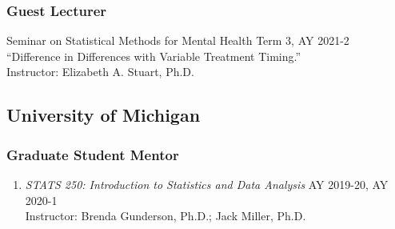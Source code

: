 \documentclass[letterpaper,11pt]{article} %
\begin{document}
		\subsubsection*{Guest Lecturer}
		\begin{etaremune}
			\item Seminar on Statistical Methods for Mental Health \hfill Term 3, AY 2021-2 \\
			``Difference in Differences with Variable Treatment Timing.'' \\
			Instructor: Elizabeth A. Stuart, Ph.D.
		\end{etaremune}

        \subsection*{University of Michigan}
		
 		\subsubsection*{Graduate Student Mentor}
 		\begin{enumerate}
 			\item \textit{STATS 250: Introduction to Statistics and Data Analysis} \hfill AY 2019-20, AY 2020-1 \\
 			Instructor: Brenda Gunderson, Ph.D.; Jack Miller, Ph.D.
 		\end{enumerate}
	
\end{document}
